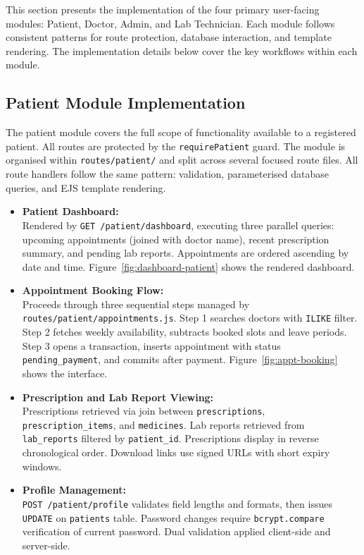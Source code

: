 \justifying
\noindent This section presents the implementation of the four primary user-facing modules: Patient, Doctor, Admin, and Lab Technician. Each module follows consistent patterns for route protection, database interaction, and template rendering. The implementation details below cover the key workflows within each module.

\subsection{Patient Module Implementation}
\label{subsec:patient-impl}

\justifying
\noindent The patient module covers the full scope of functionality available to a registered patient. All routes are protected by the \texttt{requirePatient} guard. The module is organised within \texttt{routes/patient/} and split across several focused route files. All route handlers follow the same pattern: validation, parameterised database queries, and EJS template rendering.

\begin{itemize}
    \item \textbf{Patient Dashboard:} \\
    Rendered by \texttt{GET /patient/dashboard}, executing three parallel queries: upcoming appointments (joined with doctor name), recent prescription summary, and pending lab reports. Appointments are ordered ascending by date and time. Figure~\ref{fig:dashboard-patient} shows the rendered dashboard.

    \item \textbf{Appointment Booking Flow:} \\
    Proceeds through three sequential steps managed by \texttt{routes/patient/appointments.js}. Step 1 searches doctors with \texttt{ILIKE} filter. Step 2 fetches weekly availability, subtracts booked slots and leave periods. Step 3 opens a transaction, inserts appointment with status \texttt{pending\_payment}, and commits after payment. Figure~\ref{fig:appt-booking} shows the interface.

    \item \textbf{Prescription and Lab Report Viewing:} \\
    Prescriptions retrieved via join between \texttt{prescriptions}, \texttt{prescription\_items}, and \texttt{medicines}. Lab reports retrieved from \texttt{lab\_reports} filtered by \texttt{patient\_id}. Prescriptions display in reverse chronological order. Download links use signed URLs with short expiry windows.

    \item \textbf{Profile Management:} \\
    \texttt{POST /patient/profile} validates field lengths and formats, then issues \texttt{UPDATE} on \texttt{patients} table. Password changes require \texttt{bcrypt.compare} verification of current password. Dual validation applied client-side and server-side.
\end{itemize}

